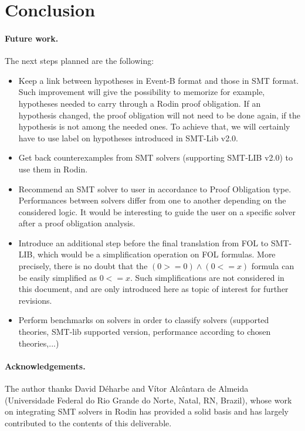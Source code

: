 \documentclass[10pt,a4paper]{report}
\begin{document}





\section{Conclusion}

\paragraph{Future work.} 
The next steps planned are the following:
\begin{itemize}
\item Keep a link between hypotheses in Event-B format and those in SMT format. 
Such improvement will give the possibility to memorize for example, hypotheses needed to carry through a Rodin proof obligation. If an hypothesis changed, the proof obligation will not need to be done again, if the hypothesis is not among the needed ones. To achieve that, we will certainly have to use label on hypotheses introduced in SMT-Lib v2.0.
\item Get back counterexamples from SMT solvers (supporting SMT-LIB v2.0) to use them in 
Rodin.
\item Recommend an SMT solver to user in accordance to Proof Obligation type. Performances 
between solvers differ from one to another depending on the considered logic. It would be interesting to 
guide the user on a specific solver after a proof obligation analysis.  
\item Introduce an additional step before the final translation from FOL to SMT-LIB, 
which would be a simplification operation on FOL formulas. More precisely, there 
is no doubt that the $(0 >= 0) \wedge (0 <= x)$ formula can be easily simplified as 
$0 <= x$. Such simplifications are not considered in this document, and are only 
introduced here as topic of interest for further revisions.
\item Perform benchmarks on solvers in order to classify solvers (supported theories, SMT-lib supported version, performance according to chosen theories,...)

\end{itemize}

\paragraph{Acknowledgements.} 
The author thanks David D\'eharbe and V\'itor Alc\^antara de Almeida (Universidade Federal do Rio Grande do Norte, Natal, RN, Brazil), whose work on integrating SMT solvers in Rodin \cite{RODINSMT10} has provided a solid basis and has largely contributed to the contents of this deliverable.
\end{document}
